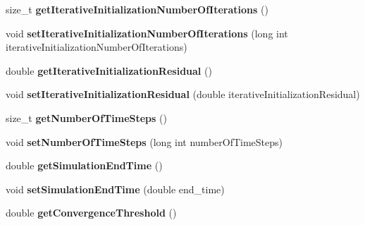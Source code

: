 \begin{DoxyCompactItemize}
\item 
\hypertarget{classnatrium_1_1SolverConfiguration_aa12123336ffa7489780baa45d99569b1}{
size\_\-t {\bfseries getIterativeInitializationNumberOfIterations} ()}
\label{classnatrium_1_1SolverConfiguration_aa12123336ffa7489780baa45d99569b1}

\item 
\hypertarget{classnatrium_1_1SolverConfiguration_ac4188dce03b129130f153f7028c3f79e}{
void {\bfseries setIterativeInitializationNumberOfIterations} (long int iterativeInitializationNumberOfIterations)}
\label{classnatrium_1_1SolverConfiguration_ac4188dce03b129130f153f7028c3f79e}

\item 
\hypertarget{classnatrium_1_1SolverConfiguration_a966eee9da52af6fbd1f8d5fad2b8427a}{
double {\bfseries getIterativeInitializationResidual} ()}
\label{classnatrium_1_1SolverConfiguration_a966eee9da52af6fbd1f8d5fad2b8427a}

\item 
\hypertarget{classnatrium_1_1SolverConfiguration_ad9551932a38bda46c8ca2ef88a73e754}{
void {\bfseries setIterativeInitializationResidual} (double iterativeInitializationResidual)}
\label{classnatrium_1_1SolverConfiguration_ad9551932a38bda46c8ca2ef88a73e754}

\item 
\hypertarget{classnatrium_1_1SolverConfiguration_a13121a202636553339d5b1f83d196fd7}{
size\_\-t {\bfseries getNumberOfTimeSteps} ()}
\label{classnatrium_1_1SolverConfiguration_a13121a202636553339d5b1f83d196fd7}

\item 
\hypertarget{classnatrium_1_1SolverConfiguration_a50c43893f5c6ed0d73fcccd64f523053}{
void {\bfseries setNumberOfTimeSteps} (long int numberOfTimeSteps)}
\label{classnatrium_1_1SolverConfiguration_a50c43893f5c6ed0d73fcccd64f523053}

\item 
\hypertarget{classnatrium_1_1SolverConfiguration_aa0d9cd3a8d2e6e04fc33e3b4fb8785d9}{
double {\bfseries getSimulationEndTime} ()}
\label{classnatrium_1_1SolverConfiguration_aa0d9cd3a8d2e6e04fc33e3b4fb8785d9}

\item 
\hypertarget{classnatrium_1_1SolverConfiguration_a0d64bd79313ae1aa022d9a2c0e6bc3fd}{
void {\bfseries setSimulationEndTime} (double end\_\-time)}
\label{classnatrium_1_1SolverConfiguration_a0d64bd79313ae1aa022d9a2c0e6bc3fd}

\item 
\hypertarget{classnatrium_1_1SolverConfiguration_a221b5a32cb4cc871536f68a26e14b3c8}{
double {\bfseries getConvergenceThreshold} ()}
\label{classnatrium_1_1SolverConfiguration_a221b5a32cb4cc871536f68a26e14b3c8}


\end{DoxyCompactItemize}
